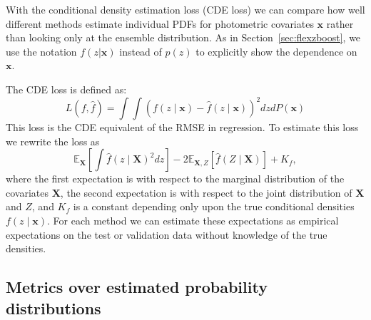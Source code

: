 \documentclass[usenatbib]{mn2e}
\newcommand{\red}[1]{\textcolor{red}{#1}}
\newcommand{\aim}[1]{\textcolor{green}{#1}}%
\def\X{{\mathbf{X}}}
\def\x{{\mathbf{x}}}
\begin{document}
With the conditional density estimation loss (CDE loss) we can compare how well different methods estimate individual PDFs for photometric covariates $\x$ rather than looking only at the ensemble distribution.  As in Section~\ref{sec:flexzboost}, we use the notation $f(z \vert \x)$ instead of $p(z)$ to explicitly show the dependence on $\x$. 


The CDE loss is defined as:
\begin{equation} \label{eq:cde-loss}
L(f, \widehat{f}) = \int \int (f(z \mid \x) - \widehat{f}(z \mid \x))^{2} dz dP(\x)
\end{equation}
This loss is the CDE equivalent of the RMSE in regression. To estimate this loss we rewrite the loss as
\begin{equation} \label{eq:estimated-cde-loss}
\mathbb{E}_\X \left[\int \widehat{f}(z \mid \X)^{2} dz\right] - 2 \mathbb{E}_{\X,Z}\left[\widehat{f}(Z \mid \X)\right] + K_{f},
\end{equation}
where the first expectation is with respect to the marginal distribution of the covariates $\X$, the second expectation is with respect to the joint distribution of $\X$ and $Z$, and $K_{f}$ is a constant depending only upon the true conditional densities $f(z\mid \x)$. 
For each method we can estimate these expectations as empirical expectations on the test or validation data \citep[Eq.~7 in][]{Izbicki:17b} without knowledge of the true densities.


\subsection{Metrics over estimated probability distributions}
\label{sec:quantmet}
\end{document}
